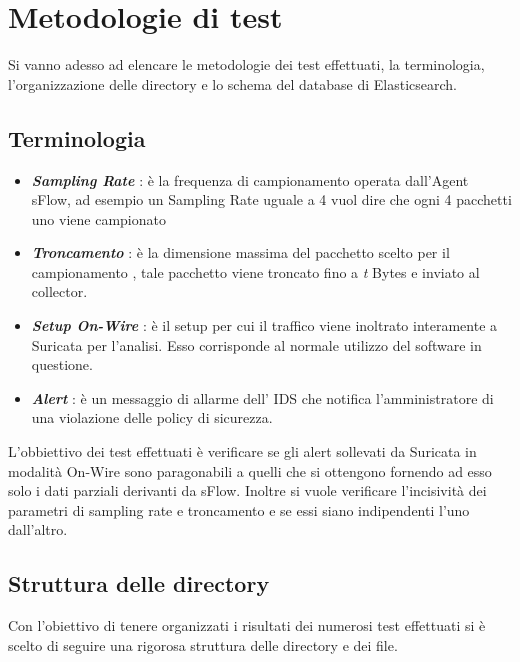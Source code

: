 \documentclass[12pt,a4paper,openright,twoside]{report}
\begin{document}
\section{Metodologie di test}

Si vanno adesso ad elencare le metodologie dei test effettuati, la terminologia, l'organizzazione delle
directory e lo schema del database di Elasticsearch.

\subsection{Terminologia}

\begin{itemize}
  \item {\it \bf Sampling Rate} : \`e la frequenza di campionamento operata dall'Agent sFlow,
  ad esempio un Sampling Rate uguale a 4 vuol dire che ogni 4 pacchetti uno viene
  campionato
  \item {\it \bf Troncamento} : \`e la dimensione massima del pacchetto scelto per il campionamento
  , tale pacchetto viene troncato fino a {\it t} Bytes e inviato al collector.
  \item {\it \bf Setup On-Wire} : \`e il setup per cui il traffico viene inoltrato interamente
  a Suricata per l'analisi. Esso corrisponde al normale utilizzo del software in questione.
  \item {\it \bf Alert} : \`e un messaggio di allarme dell' IDS che notifica l'amministratore
  di una violazione delle policy di sicurezza.
\end{itemize}


L'obbiettivo dei test effettuati  \`e verificare se gli alert sollevati da Suricata
in modalit\`a On-Wire sono paragonabili a quelli che si ottengono fornendo ad esso solo
i dati parziali derivanti da sFlow.
Inoltre si vuole verificare l'incisivit\`a dei parametri di sampling rate e troncamento e
se essi siano indipendenti l'uno dall'altro.

\subsection{Struttura delle directory}

Con l'obiettivo di tenere organizzati i risultati dei numerosi test effettuati si
\`e scelto di seguire una rigorosa struttura delle directory e dei file.
\end{document}
